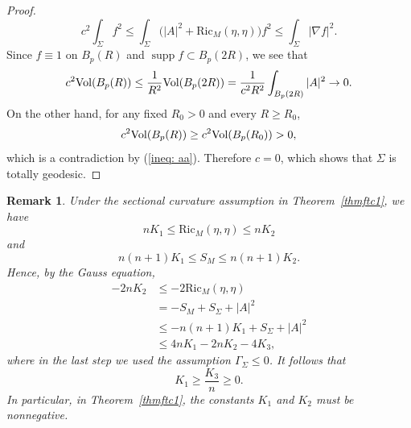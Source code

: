 \documentclass[amssymb,amstex,amsmath,11pt]{article}
\numberwithin{equation}{section}
\theoremstyle{plain}
\newtheorem{rmk}[thm]{Remark}
\theoremstyle{definition}
\theoremstyle{remark}
\newcommand{\Vol}{{\rm Vol}}
\def\Ric{\textrm{Ric}}
\begin{document}
\begin{proof}
$$
c^2\int_\Sigma f^2
\le
\int_\Sigma
\bigl(|A|^2+\Ric_M(\eta,\eta)\bigr)f^2
\le
\int_\Sigma|\nabla f|^2.
$$
Since $f\equiv1$ on $B_p(R)$ and $\operatorname{supp}f\subset B_p(2R)$, we see that
\begin{align}
c^2\Vol(B_p(R)) \le \frac{1}{R^2}\Vol(B_p(2R)) = \frac{1}{c^2R^2}\int_{B_p(2R)}|A|^2 \rightarrow0. \label{ineq: aa}
\end{align}
On the other hand, for any fixed $R_0>0$ and every $R\ge R_0$, 
$$c^2\Vol(B_p(R))\ge c^2\Vol(B_p(R_0))>0,$$
which is a contradiction by (\ref{ineq: aa}). Therefore $c=0$, which shows that $\Sigma$ is totally geodesic.








\end{proof}


\begin{rmk}
\rm
Under the sectional curvature assumption in Theorem~\ref{thmftc1}, we have
$$
nK_1\le \Ric_M(\eta,\eta)\le nK_2
$$
and
$$
n(n+1)K_1\le S_M\le n(n+1)K_2.
$$
Hence, by the Gauss equation,
\begin{align*}
-2nK_2
&\le -2\Ric_M(\eta,\eta) \\
&= -S_M+S_\Sigma+|A|^2 \\
&\le -n(n+1)K_1+S_\Sigma+|A|^2 \\
&\le 4nK_1-2nK_2-4K_3,
\end{align*}
where in the last step we used the assumption $\Gamma_\Sigma\le 0$. It follows that
$$
K_1\ge \frac{K_3}{n}\ge 0.
$$
In particular, in Theorem~\ref{thmftc1}, the constants $K_1$ and $K_2$ must be nonnegative.
\end{rmk}







\end{document}
